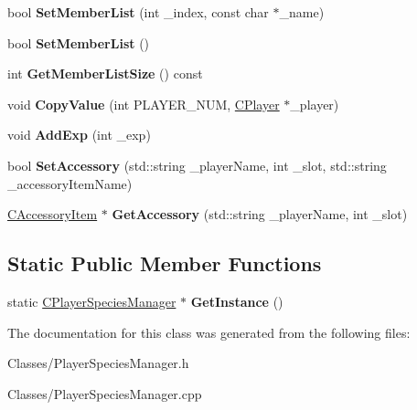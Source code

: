 \begin{DoxyCompactItemize}
\item 
bool {\bfseries Set\+Member\+List} (int \+\_\+index, const char $\ast$\+\_\+name)\hypertarget{class_c_player_species_manager_a4da79d2e642e76cd9c8751c0c7b588a4}{}\label{class_c_player_species_manager_a4da79d2e642e76cd9c8751c0c7b588a4}

\item 
bool {\bfseries Set\+Member\+List} ()\hypertarget{class_c_player_species_manager_a5f040b572abdf718340814149ed8a164}{}\label{class_c_player_species_manager_a5f040b572abdf718340814149ed8a164}

\item 
int {\bfseries Get\+Member\+List\+Size} () const \hypertarget{class_c_player_species_manager_a977388c23d3f42f25bca2b4035e3ba92}{}\label{class_c_player_species_manager_a977388c23d3f42f25bca2b4035e3ba92}

\item 
void {\bfseries Copy\+Value} (int P\+L\+A\+Y\+E\+R\+\_\+\+N\+UM, \hyperlink{class_c_player}{C\+Player} $\ast$\+\_\+player)\hypertarget{class_c_player_species_manager_a9dcebaabd5feb461dae6f8b7ddb0d0dd}{}\label{class_c_player_species_manager_a9dcebaabd5feb461dae6f8b7ddb0d0dd}

\item 
void {\bfseries Add\+Exp} (int \+\_\+exp)\hypertarget{class_c_player_species_manager_a270ce50fe517ad750b6b98a93e2140d5}{}\label{class_c_player_species_manager_a270ce50fe517ad750b6b98a93e2140d5}

\item 
bool {\bfseries Set\+Accessory} (std\+::string \+\_\+player\+Name, int \+\_\+slot, std\+::string \+\_\+accessory\+Item\+Name)\hypertarget{class_c_player_species_manager_abd020befdb5aff30407fa40987d4a164}{}\label{class_c_player_species_manager_abd020befdb5aff30407fa40987d4a164}

\item 
\hyperlink{class_c_accessory_item}{C\+Accessory\+Item} $\ast$ {\bfseries Get\+Accessory} (std\+::string \+\_\+player\+Name, int \+\_\+slot)\hypertarget{class_c_player_species_manager_af10e66b4500bec2bfc56deeee0e64d05}{}\label{class_c_player_species_manager_af10e66b4500bec2bfc56deeee0e64d05}

\end{DoxyCompactItemize}
\subsection*{Static Public Member Functions}
\begin{DoxyCompactItemize}
\item 
static \hyperlink{class_c_player_species_manager}{C\+Player\+Species\+Manager} $\ast$ {\bfseries Get\+Instance} ()\hypertarget{class_c_player_species_manager_a6141d74620bc72c22542ba19ee064a2c}{}\label{class_c_player_species_manager_a6141d74620bc72c22542ba19ee064a2c}

\end{DoxyCompactItemize}


The documentation for this class was generated from the following files\+:\begin{DoxyCompactItemize}
\item 
Classes/Player\+Species\+Manager.\+h\item 
Classes/Player\+Species\+Manager.\+cpp\end{DoxyCompactItemize}
